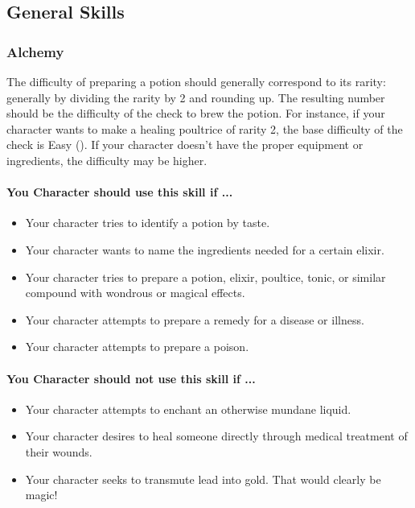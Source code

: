 \subsection{General Skills}
\begin{multicols}{2}
\subsubsection{Alchemy}\label{skill:alchemy}
The difficulty of preparing a potion should generally correspond
to its rarity: generally by dividing the rarity by 2 and rounding up.
The resulting number should be the difficulty of the check to brew the
potion. For instance, if your character wants to make a healing poultrice
of rarity 2, the base difficulty of the check is Easy (\difficulty).
If your character doesn’t have the proper equipment or ingredients,
the difficulty may be higher.
\paragraph{You Character should use this skill if ...}
\begin{itemize}
    \item Your character tries to identify a potion by taste.
    \item Your character wants to name the ingredients needed for a certain elixir.
    \item Your character tries to prepare a potion, elixir, poultice, tonic, or
        similar compound with wondrous or magical effects.
    \item Your character attempts to prepare a remedy for a disease or illness.
    \item Your character attempts to prepare a poison.
\end{itemize}
\paragraph{You Character should not use this skill if ...}
\begin{itemize}
    \item Your character attempts to enchant an otherwise mundane liquid.
    \item Your character desires to heal someone directly through medical treatment
        of their wounds.
    \item Your character seeks to transmute lead into gold. That would clearly
        be magic!
\end{itemize}


\end{multicols}
